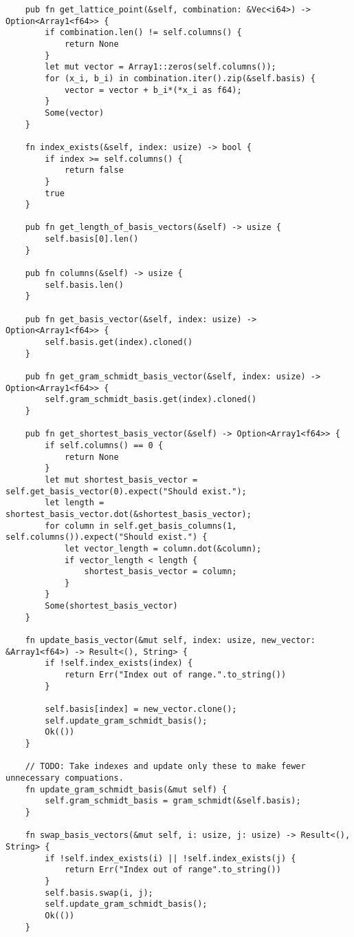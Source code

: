 \begin{verbatim}
    pub fn get_lattice_point(&self, combination: &Vec<i64>) -> Option<Array1<f64>> {
        if combination.len() != self.columns() {
            return None
        }
        let mut vector = Array1::zeros(self.columns());
        for (x_i, b_i) in combination.iter().zip(&self.basis) {
            vector = vector + b_i*(*x_i as f64);
        }
        Some(vector)
    }

    fn index_exists(&self, index: usize) -> bool {
        if index >= self.columns() {
            return false
        }
        true
    }

    pub fn get_length_of_basis_vectors(&self) -> usize {
        self.basis[0].len()
    }

    pub fn columns(&self) -> usize {
        self.basis.len()
    }

    pub fn get_basis_vector(&self, index: usize) -> Option<Array1<f64>> {
        self.basis.get(index).cloned()
    }

    pub fn get_gram_schmidt_basis_vector(&self, index: usize) -> Option<Array1<f64>> {
        self.gram_schmidt_basis.get(index).cloned()
    }

    pub fn get_shortest_basis_vector(&self) -> Option<Array1<f64>> {
        if self.columns() == 0 {
            return None
        }
        let mut shortest_basis_vector = self.get_basis_vector(0).expect("Should exist.");
        let length = shortest_basis_vector.dot(&shortest_basis_vector);
        for column in self.get_basis_columns(1, self.columns()).expect("Should exist.") {
            let vector_length = column.dot(&column);
            if vector_length < length {
                shortest_basis_vector = column;
            }
        }
        Some(shortest_basis_vector)
    }

    fn update_basis_vector(&mut self, index: usize, new_vector: &Array1<f64>) -> Result<(), String> {
        if !self.index_exists(index) {
            return Err("Index out of range.".to_string())
        }

        self.basis[index] = new_vector.clone();
        self.update_gram_schmidt_basis();
        Ok(())
    }

    // TODO: Take indexes and update only these to make fewer unnecessary compuations.
    fn update_gram_schmidt_basis(&mut self) {
        self.gram_schmidt_basis = gram_schmidt(&self.basis);
    }

    fn swap_basis_vectors(&mut self, i: usize, j: usize) -> Result<(), String> {
        if !self.index_exists(i) || !self.index_exists(j) {
            return Err("Index out of range".to_string())
        }
        self.basis.swap(i, j);
        self.update_gram_schmidt_basis();
        Ok(())
    }


\end{verbatim}
